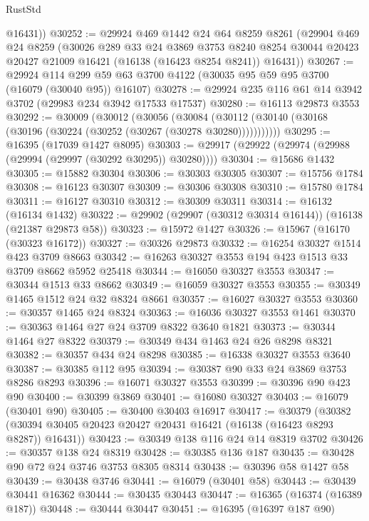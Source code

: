 \begin{lexlean}{RustStd}
\begin{coremodule}
        @16431))
@30252 := @29924
    @469
    @1442
    @24
    @64
    @8259
    @8261
    (@29904
      @469
      @24
      @8259
      (@30026
        @289
        @33
        @24
        @3869
        @3753
        @8240
        @8254
        @30044
        @20423
        @20427
        @21009
        @16421
        (@16138 (@16423 @8254 @8241))
        @16431))
@30267 := @29924
    @114
    @299
    @59
    @63
    @3700
    @4122
    (@30035 @95 @59 @95 @3700 (@16079 (@30040 @95)) @16107)
@30278 := @29924 @235 @116 @61 @14 @3942 @3702 (@29983 @234 @3942 @17533 @17537)
@30280 := @16113 @29873 @3553
@30292 := @30009
    (@30012
      (@30056
        (@30084 (@30112 (@30140 (@30168 (@30196 (@30224 (@30252 (@30267 (@30278 @30280)))))))))))
@30295 := @16395 (@17039 @1427 @8095)
@30303 := @29917 (@29922 (@29974 (@29988 (@29994 (@29997 (@30292 @30295)) @30280))))
@30304 := @15686 @1432
@30305 := @15882 @30304
@30306 := @30303 @30305
@30307 := @15756 @1784
@30308 := @16123 @30307
@30309 := @30306 @30308
@30310 := @15780 @1784
@30311 := @16127 @30310
@30312 := @30309 @30311
@30314 := @16132 (@16134 @1432)
@30322 := @29902 (@29907 (@30312 @30314 @16144)) (@16138 (@21387 @29873 @58))
@30323 := @15972 @1427
@30326 := @15967 (@16170 (@30323 @16172))
@30327 := @30326 @29873
@30332 := @16254 @30327 @1514 @423 @3709 @8663
@30342 := @16263 @30327 @3553 @194 @423 @1513 @33 @3709 @8662 @5952 @25418
@30344 := @16050 @30327 @3553
@30347 := @30344 @1513 @33 @8662
@30349 := @16059 @30327 @3553
@30355 := @30349 @1465 @1512 @24 @32 @8324 @8661
@30357 := @16027 @30327 @3553
@30360 := @30357 @1465 @24 @8324
@30363 := @16036 @30327 @3553 @1461
@30370 := @30363 @1464 @27 @24 @3709 @8322 @3640 @1821
@30373 := @30344 @1464 @27 @8322
@30379 := @30349 @434 @1463 @24 @26 @8298 @8321
@30382 := @30357 @434 @24 @8298
@30385 := @16338 @30327 @3553 @3640
@30387 := @30385 @112 @95
@30394 := @30387 @90 @33 @24 @3869 @3753 @8286 @8293
@30396 := @16071 @30327 @3553
@30399 := @30396 @90 @423 @90
@30400 := @30399 @3869
@30401 := @16080 @30327
@30403 := @16079 (@30401 @90)
@30405 := @30400 @30403 @16917
@30417 := @30379
    (@30382 (@30394 @30405 @20423 @20427 @20431 @16421 (@16138 (@16423 @8293 @8287)) @16431))
@30423 := @30349 @138 @116 @24 @14 @8319 @3702
@30426 := @30357 @138 @24 @8319
@30428 := @30385 @136 @187
@30435 := @30428 @90 @72 @24 @3746 @3753 @8305 @8314
@30438 := @30396 @58 @1427 @58
@30439 := @30438 @3746
@30441 := @16079 (@30401 @58)
@30443 := @30439 @30441 @16362
@30444 := @30435 @30443
@30447 := @16365 (@16374 (@16389 @187))
@30448 := @30444 @30447
@30451 := @16395 (@16397 @187 @90)

\end{coremodule}
\end{lexlean}

